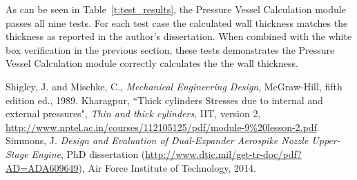 \documentclass{article}
\begin{document}
As can be seen in Table~\ref{t:test_results}, the Pressure Vessel Calculation module passes all nine tests.  For each test case the calculated wall thickness matches the thickness as reported in the author's dissertation.  When combined with the white box verification in the previous section, these tests demonstrates the Pressure Vessel Calculation module correctly calculates the the wall thickness.


\begin{thebibliography}{9}

 Shigley, J. and Mischke, C., \emph{Mechanical Engineering Design}, McGraw-Hill, fifth edition ed., 1989.
 Kharagpur, ``Thick cylinders Stresses due to internal and external pressures", \emph{Thin and thick cylinders}, IIT, version 2, \url{http://www.nptel.ac.in/courses/112105125/pdf/module-9\%20lesson-2.pdf}.
 Simmons, J. \textit{Design and Evaluation of Dual-Expander Aerospike Nozzle Upper-Stage Engine}, PhD dissertation (\url{http://www.dtic.mil/get-tr-doc/pdf?AD=ADA609649}), Air Force Institute of Technology, 2014.

\end{thebibliography}
\end{document}
